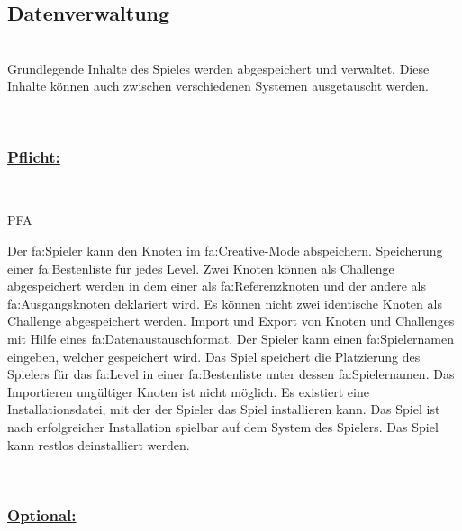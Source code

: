 %
%


\subsection{Datenverwaltung}

%
%
\renewcommand{\K}{}
%
%

~\\
Grundlegende Inhalte des Spieles werden abgespeichert und verwaltet.
Diese Inhalte können auch zwischen verschiedenen Systemen ausgetauscht werden.

~\\

%
%
\subsubsection*{\underline{Pflicht:}}~\\

\begin{ids}{\gls{PFA\K}}

	\id[ 390] Der \gls{fa:Spieler} kann den Knoten im \gls{fa:Creative}-Mode abspeichern.
	\id[ 400]Speicherung einer \gls{fa:Bestenliste} für jedes Level.
	\id[ 410] Zwei Knoten können als Challenge abgespeichert werden in dem einer als \gls{fa:Referenzknoten} und der andere als \gls{fa:Ausgangsknoten} deklariert wird.
	\id[420] Es können nicht zwei identische Knoten als Challenge abgespeichert werden.
	\id[ 430] Import und Export von Knoten und Challenges mit Hilfe eines \gls{fa:Datenaustauschformat}.
	\id[ 440] Der Spieler kann einen \gls{fa:Spielername}n eingeben, welcher gespeichert wird.
	\id[ 450] Das Spiel speichert die Platzierung des Spielers  für das \gls{fa:Level} in einer \gls{fa:Bestenliste} unter dessen \gls{fa:Spielername}n.
	\id[ 460] Das Importieren ungültiger Knoten ist nicht möglich.
	\id[ 470] Es existiert eine Installationsdatei, mit der der Spieler das Spiel installieren kann. Das Spiel ist nach erfolgreicher Installation spielbar auf dem System des Spielers.
	\id[ 475] Das Spiel kann restlos deinstalliert werden. 
 	
 	
	
\end{ids}

~\\


%
%
\subsubsection*{\underline{Optional:}}~\\


